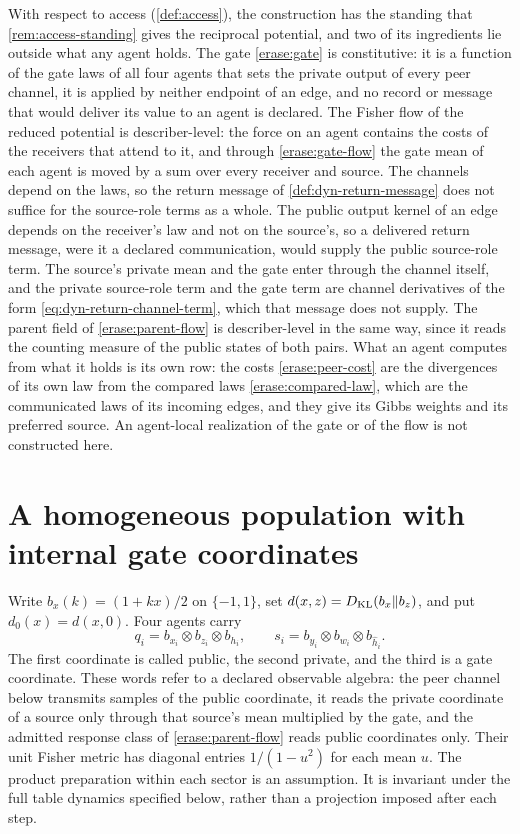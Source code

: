 With respect to access (\cref{def:access}), the construction has the standing that \cref{rem:access-standing} gives the reciprocal potential, and two of its ingredients lie outside what any agent holds. The gate \cref{erase:gate} is constitutive: it is a function of the gate laws of all four agents that sets the private output of every peer channel, it is applied by neither endpoint of an edge, and no record or message that would deliver its value to an agent is declared. The Fisher flow of the reduced potential is describer-level: the force on an agent contains the costs of the receivers that attend to it, and through \cref{erase:gate-flow} the gate mean of each agent is moved by a sum over every receiver and source. The channels depend on the laws, so the return message of \cref{def:dyn-return-message} does not suffice for the source-role terms as a whole. The public output kernel of an edge depends on the receiver's law and not on the source's, so a delivered return message, were it a declared communication, would supply the public source-role term. The source's private mean and the gate enter through the channel itself, and the private source-role term and the gate term are channel derivatives of the form \cref{eq:dyn-return-channel-term}, which that message does not supply. The parent field of \cref{erase:parent-flow} is describer-level in the same way, since it reads the counting measure of the public states of both pairs. What an agent computes from what it holds is its own row: the costs \cref{erase:peer-cost} are the divergences of its own law from the compared laws \cref{erase:compared-law}, which are the communicated laws of its incoming edges, and they give its Gibbs weights and its preferred source. An agent-local realization of the gate or of the flow is not constructed here.

\section{A homogeneous population with internal gate coordinates}

Write $b_x(k)=(1+kx)/2$ on $\{-1,1\}$, set $d(x,z)=D_{\mathrm{KL}}(b_x\Vert b_z)$, and put $d_0(x)=d(x,0)$. Four agents carry
\begin{equation}
 q_i=b_{x_i}\otimes b_{z_i}\otimes b_{h_i},\qquad
 s_i=b_{y_i}\otimes b_{w_i}\otimes b_{\widehat h_i}.
 \label{erase:family}
\end{equation}
The first coordinate is called public, the second private, and the third is a gate coordinate. These words refer to a declared observable algebra: the peer channel below transmits samples of the public coordinate, it reads the private coordinate of a source only through that source's mean multiplied by the gate, and the admitted response class of \cref{erase:parent-flow} reads public coordinates only. Their unit Fisher metric has diagonal entries $1/(1-u^2)$ for each mean $u$. The product preparation within each sector is an assumption. It is invariant under the full table dynamics specified below, rather than a projection imposed after each step.

